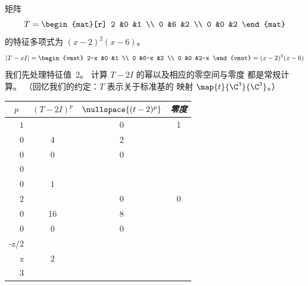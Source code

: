 \begin{example} \label{ex:FirstJordForm}
矩阵
\begin{equation*}
   T=
   \begin{mat}[r]
     2  &0  &1  \\
     0  &6  &2  \\
     0  &0  &2
   \end{mat}
\end{equation*}
的特征多项式为 \( (x-2)^2(x-6) \)。
\begin{equation*}
   |T-xI|=
   \begin{vmat}
     2-x  &0    &1  \\
     0    &6-x  &2  \\
     0    &0    &2-x
   \end{vmat}
   =(x-2)^2(x-6)
\end{equation*}
我们先处理特征值~$2$。
计算 $T-2I$ 的幂以及相应的零空间与零度
都是常规计算。
（回忆我们的约定：$T$ 表示关于标准基的
映射 $\map{t}{\C^3}{\C^3}$。）
\begin{center}
  \renewcommand{\arraystretch}{1.25}
  \begin{tabular}{r|ccc} 
    \multicolumn{1}{c}{\( p \)}  
         &\( (T-2I)^p \) &\( \nullspace{(t-2)^p}  \) 
         &\textit{零度}                                            \\  
    \hline
    \( 1 \)
    &\matrixvenlarge{\begin{mat}[r]
          0  &0  &1  \\
          0  &4  &2  \\
          0  &0  &0
        \end{mat}}
    &\( \set{\matrixvenlarge{\colvec{x \\ 0 \\ 0}}
         \suchthat x\in\C}  \)  
    &$1$                                                   \\
    \( 2 \)
    &\matrixvenlarge{\begin{mat}[r]
          0  &0  &0  \\
          0  &16 &8  \\
          0  &0  &0
        \end{mat}}
    &\( \set{\matrixvenlarge{\colvec{x \\ -z/2 \\  z}}
               \suchthat x,z\in\C}  \) 
    &$2$                                                   \\
    \( 3 \)
    &\matrixvenlarge{\begin{mat}[r]

\end{mat}}
\end{tabular}
\end{center}
\end{example}
